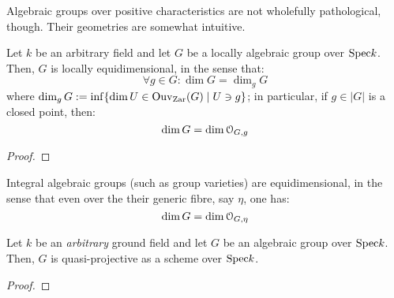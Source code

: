                 Algebraic groups over positive characteristics are not wholefully pathological, though. Their geometries are somewhat intuitive.
                \begin{proposition} \label{prop: algebraic_groups_are_locally_equidimensional} 
                    Let $k$ be an arbitrary field and let $G$ be a locally algebraic group over $\mathrm{Spec} k$. Then, $G$ is locally equidimensional, in the sense that:
                        $$\forall g \in G: \dim G = \dim_g G$$
                    where $\dim_g G := \inf\{\dim U \in \mathrm{Ouv}_{\mathrm{Zar}}(G) \mid U \ni g\}$; in particular, if $g \in |G|$ is a closed point, then:
                        $$\dim G = \dim \mathcal{O}_{G, g}$$
                \end{proposition}
                    \begin{proof}
                        
                    \end{proof}
                \begin{corollary}
                    Integral algebraic groups (such as group varieties) are equidimensional, in the sense that even over the their generic fibre, say $\eta$, one has:
                        $$\dim G = \dim \mathcal{O}_{G, \eta}$$
                \end{corollary}
                
                \begin{proposition} \label{prop: algebraic_groups_are_quasi_projective} 
                    Let $k$ be an \textit{arbitrary} ground field and let $G$ be an algebraic group over $\mathrm{Spec} k$. Then, $G$ is quasi-projective as a scheme over $\mathrm{Spec} k$.
                \end{proposition}
                    \begin{proof}
                        
                    \end{proof}
                
